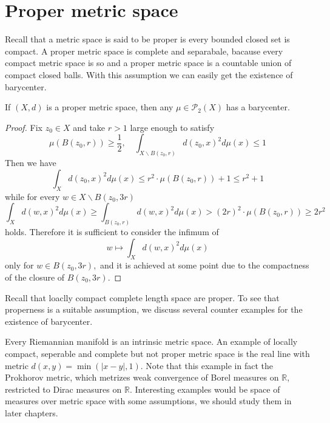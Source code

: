 \chapter{Proper metric space}

Recall that a metric space is said to be proper is every bounded closed set is compact. A proper metric space is complete and separabale, bacause every compact metric space is so and a proper metric space is a countable union of compact closed balls. With this assumption we can easily get the existence of barycenter.

\begin{lem}
	\label{lem:existence_proper_space}
	If \( ( X , d ) \) is a proper metric space, then any \( \mu \in \mathcal { P } _ { 2 } ( X ) \) has a barycenter.
\end{lem}

\begin{proof}
	Fix \( z _ { 0 } \in X \) and take \( r > 1 \) large enough to satisfy
	\[ \mu \left( B \left( z _ { 0 } , r \right) \right) \geq \frac { 1 } { 2 } , \quad \int _ { X \backslash B \left( z _ { 0 } , r \right) } d \left( z _ { 0 } , x \right) ^ { 2 } d \mu ( x ) \leq 1 \]
	Then we have
	\[ \int _ { X } d \left( z _ { 0 } , x \right) ^ { 2 } d \mu ( x ) \leq r ^ { 2 } \cdot \mu \left( B \left( z _ { 0 } , r \right) \right) + 1 \leq r ^ { 2 } + 1 \]
	while for every \( w \in X \backslash B \left( z _ { 0 } , 3 r \right) \)
	\[ \int _ { X } d ( w , x ) ^ { 2 } d \mu ( x ) \geq \int _ { B \left( z _ { 0 } , r \right) } d ( w , x ) ^ { 2 } d \mu ( x ) > ( 2 r ) ^ { 2 } \cdot \mu \left( B \left( z _ { 0 } , r \right) \right) \geq 2 r ^ { 2 } \]
	holds. Therefore it is sufficient to consider the infimum of
	\[ w \longmapsto \int _ { X } d ( w , x ) ^ { 2 } d \mu ( x ) \]
	only for \( w \in B \left( z _ { 0 } , 3 r \right) , \) and it is achieved at some point due to the compactness of the closure of \( B \left( z _ { 0 } , 3 r \right) . \)
\end{proof}

Recall that loaclly compact complete length space are proper. To see that properness is a suitable assumption, we discuss several counter examples for the existence of barycenter.

Every Riemannian manifold is an intrinsic metric space. An example of locally compact, seperable and complete but not proper metric space is the real line with metric $d(x,y)=\min(|x-y|,1)$. Note that this example in fact the Prokhorov metric, which metrizes weak convergence of Borel measures on $\mathbb{R}$, restricted to Dirac measures on $\mathbb{R}$. Interesting examples would be space of measures over metric space with some assumptions, we should study them in later chapters.

